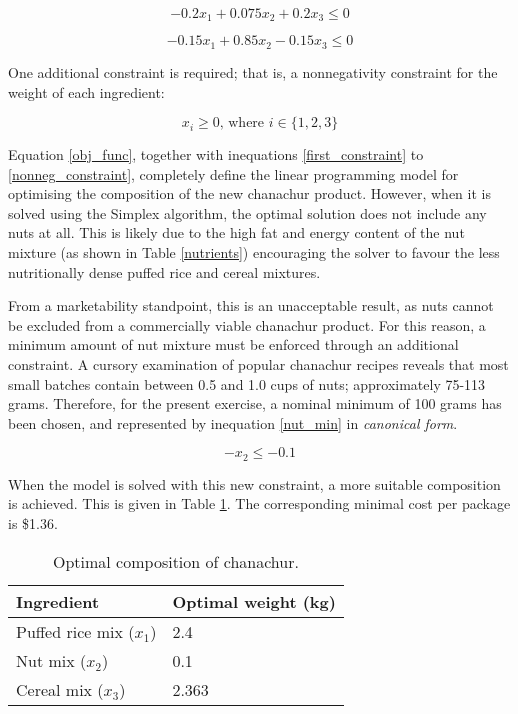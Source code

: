 \documentclass[11pt, a4paper]{article}
\begin{document}
    \begin{equation}
        -0.2x_1 + 0.075x_2 + 0.2x_3 \leq 0
    \end{equation}

    \begin{equation}
        -0.15x_1 + 0.85x_2 - 0.15x_3 \leq 0
        \label{last_constraint}
    \end{equation}

    One additional constraint is required; that is, a nonnegativity constraint for the weight of each ingredient:

    \begin{equation}
        x_i \geq 0 \textrm{, where } i \in \{1, 2, 3\}
        \label{nonneg_constraint}
    \end{equation}

    Equation \ref{obj_func}, together with inequations \ref{first_constraint} to \ref{nonneg_constraint}, completely define the linear programming model for optimising the composition of the new chanachur product. However, when it is solved using the Simplex algorithm, the optimal solution does not include any nuts at all. This is likely due to the high fat and energy content of the nut mixture (as shown in Table \ref{nutrients}) encouraging the solver to favour the less nutritionally dense puffed rice and cereal mixtures.

    From a marketability standpoint, this is an unacceptable result, as nuts cannot be excluded from a commercially viable chanachur product. For this reason, a minimum amount of nut mixture must be enforced through an additional constraint. A cursory examination of popular chanachur recipes reveals that most small batches contain between 0.5 and 1.0 cups of nuts; approximately 75-113 grams. Therefore, for the present exercise, a nominal minimum of 100 grams has been chosen, and represented by inequation \ref{nut_min} in \textit{canonical form}.

    \begin{equation}
        -x_2 \leq -0.1
        \label{nut_min}
    \end{equation}

    When the model is solved with this new constraint, a more suitable composition is achieved. This is given in Table \ref{results}. The corresponding minimal cost per package is \$1.36.

    \begin{table}[!ht]
        \centering
        \caption{Optimal composition of chanachur.}
        \begin{tabular}{|l|l|}
            \hline
            Ingredient                  & Optimal weight (kg)   \\ \hline
            Puffed rice mix ($x_1$)     & 2.4                   \\ \hline
            Nut mix ($x_2$)             & 0.1                   \\ \hline
            Cereal mix ($x_3$)          & 2.363                 \\ \hline          
        \end{tabular}
        \label{results}
    \end{table}
\end{document}
